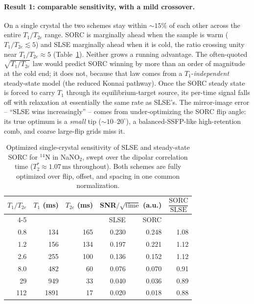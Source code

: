 \documentclass[11pt,oneside]{report}
\begin{document}
\paragraph{Result 1: comparable sensitivity, with a mild crossover.}
On a single crystal the two schemes stay within \(\sim 15\%\) of each other across
the entire \(T_1/T_{2e}\) range. SORC is marginally ahead when the sample is warm
(\(T_1/T_{2e}\lesssim 5\)) and SLSE marginally ahead when it is cold, the ratio
crossing unity near \(T_1/T_{2e}\approx 5\) (Table~\ref{tab:slse-sorc}). Neither
grows a running advantage. The often-quoted \(\sqrt{T_1/T_{2e}}\) law would predict
SORC winning by more than an order of magnitude at the cold end; it does not,
because that law comes from a \(T_1\)-\emph{independent} steady-state model (the
reduced Konnai pathway). Once the SORC steady state is forced to carry \(T_1\)
through its equilibrium-target source, its per-time signal falls off with
relaxation at essentially the same rate as SLSE's. The mirror-image error --
``SLSE wins increasingly'' -- comes from under-optimizing the SORC flip angle: its
true optimum is a \emph{small} tip (\(\sim 10\text{--}20^\circ\)), a
balanced-SSFP-like high-retention comb, and coarse large-flip grids miss it.

\begin{table}[h]
\centering
\begin{tabular}{rrrrrr}
\toprule
\(T_1/T_{2e}\) & \(T_1\) (ms) & \(T_{2e}\) (ms) & \multicolumn{2}{c}{SNR\(/\sqrt{\text{time}}\) (a.u.)} & \(\dfrac{\text{SORC}}{\text{SLSE}}\) \\
\cmidrule(lr){4-5}
& & & SLSE & SORC & \\
\midrule
0.8   & 134  & 165  & 0.230 & 0.248 & 1.08 \\
1.2   & 156  & 134  & 0.197 & 0.221 & 1.12 \\
2.6   & 255  & 100  & 0.136 & 0.152 & 1.12 \\
8.0   & 482  & 60   & 0.076 & 0.070 & 0.91 \\
29    & 949  & 33   & 0.040 & 0.036 & 0.89 \\
112   & 1891 & 17   & 0.020 & 0.018 & 0.88 \\
\bottomrule
\end{tabular}
\caption{Optimized single-crystal sensitivity of SLSE and steady-state SORC for
\({}^{14}\mathrm{N}\) in NaNO\(_2\), swept over the dipolar correlation time
(\(T_2^\ast \approx 1.07\,\mathrm{ms}\) throughout). Both schemes are fully
optimized over flip, offset, and spacing in one common normalization.}
\label{tab:slse-sorc}
\end{table}
\end{document}
